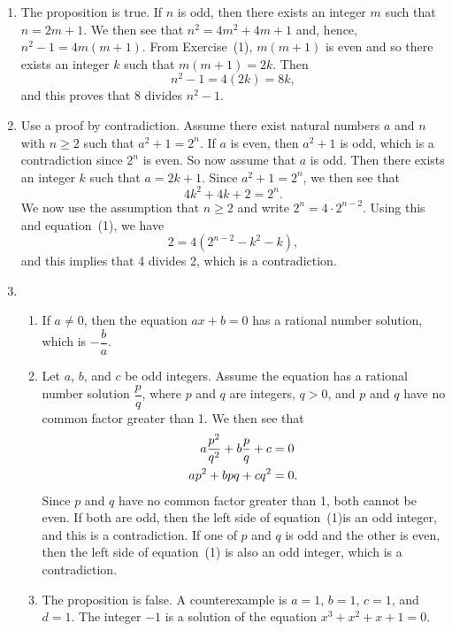 \begin{enumerate}
\item The proposition is true.  If $n$ is odd, then there exists an integer $m$ such that 
$n = 2m + 1$.  We then see that $n^2 = 4m^2 + 4m + 1$ and, hence, $n^2 - 1 = 4m(m + 1)$.  From Exercise~(1), $m(m + 1)$ is even and so there exists an integer $k$ such that 
$m(m + 1) = 2k$.  Then
\[
n^2 - 1 = 4(2k) = 8k,
\]
and this proves that 8 divides $n^2 - 1$.


\setcounter{equation}{0}
\item Use a proof by contradiction.  Assume there exist natural numbers $a$ and $n$ with 
$n \geq 2$ such that $a^2 + 1 = 2^n$.  If $a$ is even, then $a^2 + 1$ is odd, which is a contradiction since $2^n$ is even.  So now assume that $a$ is odd.  Then there exists an integer $k$ such that $a = 2k + 1$.  Since $a^2 + 1 = 2^n$, we then see that
\begin{equation}
4k^2 + 4k + 2 = 2^n.
\end{equation}
We now use the assumption that $n \geq 2$ and write $2^n = 4 \cdot 2^{n-2}$.  Using this and 
equation~(1), we have
\[
2 = 4 \left(2^{n-2} - k^2 - k \right),
\]
and this implies that 4 divides 2, which is a contradiction. 


\item \begin{enumerate}
\item If $a \ne 0$, then the equation $ax + b = 0$ has a rational number solution, which is 
$- \dfrac{b}{a}$.

\setcounter{equation}{0}
\item Let $a$, $b$, and $c$ be odd integers.  Assume the equation has a rational number solution $\dfrac{p}{q}$, where $p$ and $q$ are integers, $q > 0$, and $p$ and $q$ have no common factor greater than 1.  We then see that
\begin{align}
a \frac{p^2}{q^2} + b \frac{p}{q} + c &= 0 \notag \\
a p^2 + bpq + cq^2 &= 0.
\end{align}
Since $p$ and $q$ have no common factor greater than 1, both cannot be even.  If both are odd, then the left side of equation~(1)is an odd integer, and this is a contradiction.  If one of $p$ and $q$ is odd and the other is even, then the left side of equation~(1) is also an odd integer, which is a contradiction.

\item The proposition is false.  A counterexample is $a = 1$, $b = 1$, $c = 1$, and $d = 1$.  The integer $-1$ is a solution of the equation $x^3 + x^2 + x + 1 = 0$.
\end{enumerate}



\end{enumerate}
